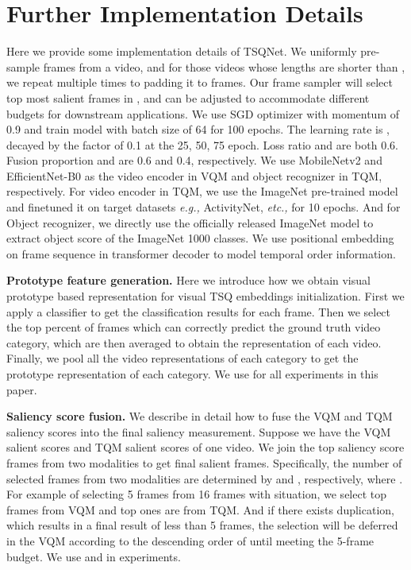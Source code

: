 \documentclass[runningheads]{llncs}
\begin{document}
\section{Further Implementation Details}\label{appendix:imp}
Here we provide some implementation details of TSQNet. 
We uniformly pre-sample  frames from a video, and for those videos whose lengths are shorter than , we repeat multiple times to padding it to  frames.
Our frame sampler will select top  most salient frames in , 
 and  can be adjusted to accommodate different budgets for downstream applications. 
We use SGD optimizer with momentum of 0.9 and train model with batch size of 64 for 100 epochs. The learning rate is  , decayed by the factor of 0.1 at the 25, 50, 75 epoch. Loss ratio  and  are both 0.6. Fusion proportion  and  are 0.6 and 0.4, respectively.
We use MobileNetv2 and EfficientNet-B0 as the video encoder in VQM and object recognizer in TQM, respectively. 
For video encoder in TQM, we use the ImageNet pre-trained model and finetuned it on target datasets \textit{e.g.,} ActivityNet, \emph{etc.,} for 10 epochs. And for Object recognizer, we directly use the officially released ImageNet model to extract object score of the ImageNet 1000 classes. We use positional embedding  on frame sequence in transformer decoder to model temporal order information.


\noindent \textbf{Prototype feature generation.}
Here we introduce how we obtain visual prototype based representation for visual TSQ embeddings initialization. 
First we apply a classifier to get the classification results for each frame. 
Then we select the top  percent of frames which can correctly predict the ground truth video category, which are then averaged to obtain the representation of each video. 
Finally, we pool all the video representations of each category to get the prototype representation of each category.
We use  for all experiments in this paper.

\noindent \textbf{Saliency score fusion.}
We describe in detail how to fuse the VQM and TQM saliency scores into the final saliency measurement. Suppose we have the VQM salient scores  and TQM salient scores  of one video. We join the top saliency score frames from two modalities to get final  salient frames. Specifically, the number of selected frames from two modalities are determined by   and , respectively, where .  
For example of selecting 5 frames from 16 frames with  situation, we select top  frames from VQM and top  ones are from TQM. And if there exists duplication, which results in a final result of less than 5 frames, the selection will be deferred in the VQM according to the descending order of  until meeting the 5-frame budget. We use  and  in experiments.
\end{document}
